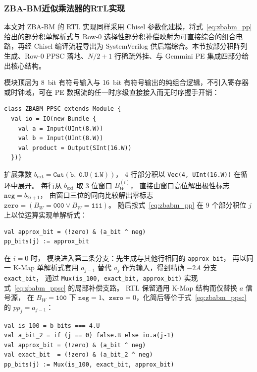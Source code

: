 \documentclass[12pt,a4paper,UTF8]{article}
\begin{document}
\subsubsection{ZBA-BM近似乘法器的RTL实现}
\label{subsec:zbabm-rtl}

本文对 ZBA-BM 的 RTL 实现同样采用 Chisel 参数化建模，将式~\eqref{eq:zbabm_pp} 给出的部分积单解析式与 Row-0 选择性部分积补偿映射为可直接综合的组合电路，再经 Chisel 编译流程导出为 SystemVerilog 供后端综合。本节按部分积阵列生成、Row-0 PPSC 落地、$N/2+1$ 行稀疏外挂、与 Gemmini PE 集成四部分给出核心结构。

模块顶层为 8~bit 有符号输入与 16~bit 有符号输出的纯组合逻辑，不引入寄存器或时钟域，可在 PE 数据流的任一时序级直接接入而无时序握手开销：

\begin{lstlisting}[caption={ZBA-BM 顶层 Chisel 接口},label={lst:zbabm-iface},basicstyle=\ttfamily\small,language={}]
class ZBABM_PPSC extends Module {
  val io = IO(new Bundle {
    val a = Input(UInt(8.W))
    val b = Input(UInt(8.W))
    val product = Output(SInt(16.W))
  })}
\end{lstlisting}

扩展乘数 $b_{\text{ext}} = \mathtt{Cat(b,\;0.U(1.W))}$，
4 行部分积以 \texttt{Vec(4, UInt(16.W))} 在循环中展开。
每行从 $b_{\text{ext}}$ 取 3 位窗口 $B_W^{(i)}$，
直接由窗口高位解出极性标志 $\mathtt{neg} = b_{2i+1}$，
由窗口三位的同向比较解出零标志 $\mathtt{zero} = (B_W = \mathtt{000} \lor B_W = \mathtt{111})$。
随后按式~\eqref{eq:zbabm_pp} 在 9 个部分积位 $j$ 上以位运算实现单解析式：

\begin{lstlisting}[caption={K-Map 单比特部分积的 Chisel 实现},label={lst:zbabm-pp-chisel},basicstyle=\ttfamily\small,language={}]
val approx_bit = (!zero) & (a_bit ^ neg)
pp_bits(j) := approx_bit
\end{lstlisting}

在 $i = 0$ 时，
模块进入第二条分支：先生成与其他行相同的 \texttt{approx\_bit}，
再以同一 K-Map 单解析式套用 $a_{j-1}$ 替代 $a_j$ 作为输入，得到精确 $-2A$ 分支 \texttt{exact\_bit}，
通过 \texttt{Mux(is\_100, exact\_bit, approx\_bit)} 实现式~\eqref{eq:zbabm_ppsc} 的局部补偿支路。
RTL 保留通用 K-Map 结构而仅替换 $a$ 信号源，
在 $B_W = \mathtt{100}$ 下 $\mathtt{neg}=1$、$\mathtt{zero}=0$，化简后等价于式~\eqref{eq:zbabm_ppsc} 的 $pp_j = a_{j-1}$：

\begin{lstlisting}[caption={Row-0 PPSC 的 Chisel 实现},label={lst:zbabm-ppsc-chisel},basicstyle=\ttfamily\small,language={}]
val is_100 = b_bits === 4.U
val a_bit_2 = if (j == 0) false.B else io.a(j-1)
val approx_bit = (!zero) & (a_bit ^ neg)
val exact_bit  = (!zero) & (a_bit_2 ^ neg)
pp_bits(j) := Mux(is_100, exact_bit, approx_bit)
\end{lstlisting}
\end{document}
